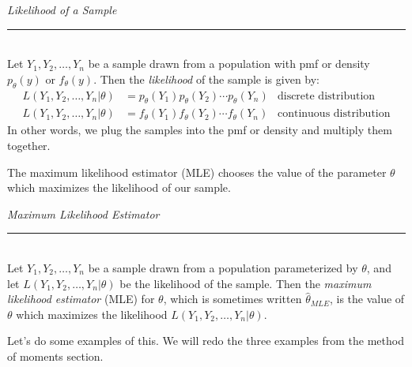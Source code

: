 \documentclass[12pt]{article}
\theoremstyle{definition}
\theoremstyle{remark}
\begin{document}
\begin{framed}
\emph{Likelihood of a Sample}\\
  \rule{\dimexpr{}\fboxrule}{.1pt} \\
Let $Y_1, Y_2, \dots, Y_n$ be a sample drawn from a population with pmf or density $p_\theta(y)$ or $f_\theta(y)$. Then the \emph{likelihood} of the sample is given by:
\begin{align*}
L(Y_1, Y_2, \dots, Y_n|\theta) &= p_\theta(Y_1) p_\theta(Y_2) \cdots p_\theta(Y_n) & \text{discrete distribution}\\
L(Y_1, Y_2, \dots, Y_n|\theta) &= f_\theta(Y_1) f_\theta(Y_2) \cdots f_\theta(Y_n) & \text{continuous distribution}
\end{align*}
In other words, we plug the samples into the pmf or density and multiply them together.
\end{framed}
The maximum likelihood estimator (MLE) chooses the value of the parameter $\theta$ which maximizes the likelihood of our sample.
\begin{framed}
\emph{Maximum Likelihood Estimator}\\
  \rule{\dimexpr{}\fboxrule}{.1pt} \\
Let $Y_1, Y_2, \dots, Y_n$ be a sample drawn from a population parameterized by $\theta$, and let $L(Y_1, Y_2, \dots, Y_n|\theta)$ be the likelihood of the sample. Then the \emph{maximum likelihood estimator} (MLE) for $\theta$, which is sometimes written $\hat{\theta}_{MLE}$, is the value of $\theta$ which maximizes the likelihood $L(Y_1, Y_2, \dots, Y_n|\theta)$.
\end{framed}

Let's do some examples of this. We will redo the three examples from the method of moments section.
\end{document}
